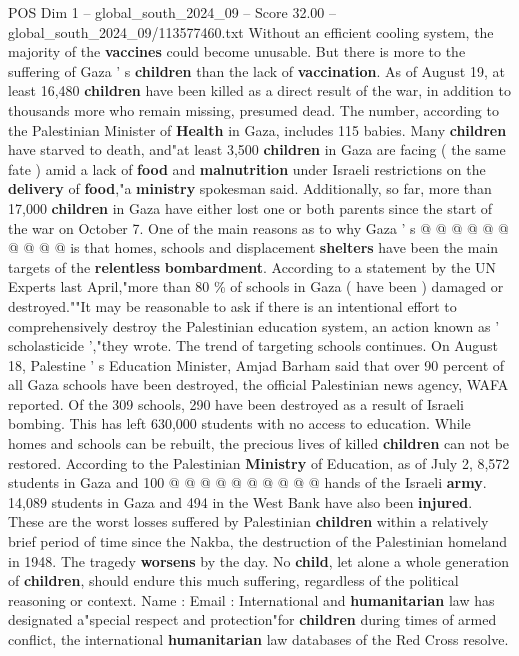 \begin{textsample}{POS Dim 1 – global\_south\_2024\_09 – Score 32.00 – global\_south\_2024\_09/113577460.txt}
Without an efficient cooling system, the majority of the \textbf{vaccines} could become unusable.
But there is more to the suffering of Gaza ' s \textbf{children} than the lack of \textbf{vaccination}.
As of August 19, at least 16,480 \textbf{children} have been killed as a direct result of the war, in addition to thousands more who remain missing, presumed dead.
The number, according to the Palestinian Minister of \textbf{Health} in Gaza, includes 115 babies.
Many \textbf{children} have starved to death, and"at least 3,500 \textbf{children} in Gaza are facing ( the same fate ) amid a lack of \textbf{food} and \textbf{malnutrition} under Israeli restrictions on the \textbf{delivery} of \textbf{food},"a \textbf{ministry} spokesman said.
Additionally, so far, more than 17,000 \textbf{children} in Gaza have either lost one or both parents since the start of the war on October 7.
One of the main reasons as to why Gaza ' s @ @ @ @ @ @ @ @ @ @ is that homes, schools and displacement \textbf{shelters} have been the main targets of the \textbf{relentless} \textbf{bombardment}.
According to a statement by the UN Experts last April,"more than 80 \% of schools in Gaza ( have been ) damaged or destroyed.""It may be reasonable to ask if there is an intentional effort to comprehensively destroy the Palestinian education system, an action known as ' scholasticide ',"they wrote.
The trend of targeting schools continues.
On August 18, Palestine ' s Education Minister, Amjad Barham said that over 90 percent of all Gaza schools have been destroyed, the official Palestinian news agency, WAFA reported.
Of the 309 schools, 290 have been destroyed as a result of Israeli bombing.
This has left 630,000 students with no access to education.
While homes and schools can be rebuilt, the precious lives of killed \textbf{children} can not be restored.
According to the Palestinian \textbf{Ministry} of Education, as of July 2, 8,572 students in Gaza and 100 @ @ @ @ @ @ @ @ @ @ hands of the Israeli \textbf{army}. 14,089 students in Gaza and 494 in the West Bank have also been \textbf{injured}.
These are the worst losses suffered by Palestinian \textbf{children} within a relatively brief period of time since the Nakba, the destruction of the Palestinian homeland in 1948.
The tragedy \textbf{worsens} by the day.
No \textbf{child}, let alone a whole generation of \textbf{children}, should endure this much suffering, regardless of the political reasoning or context.
Name : Email : International and \textbf{humanitarian} law has designated a"special respect and protection"for \textbf{children} during times of armed conflict, the international \textbf{humanitarian} law databases of the Red Cross resolve.

\end{textsample}
